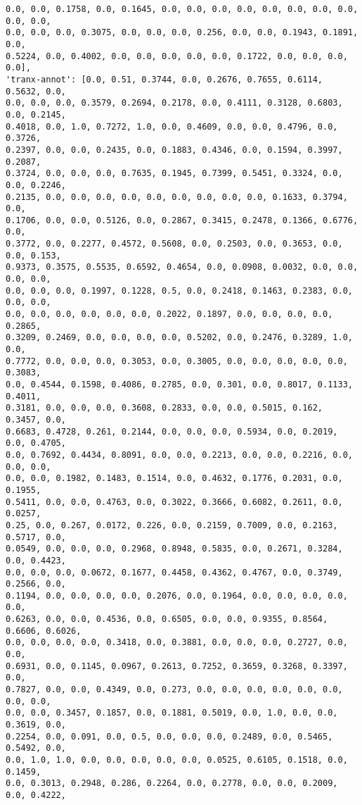 \documentclass[11pt]{article}
\begin{document}
\begin{Verbatim}[commandchars=\\\{\}]
0.0, 0.0, 0.1758, 0.0, 0.1645, 0.0, 0.0, 0.0, 0.0, 0.0, 0.0, 0.0, 0.0, 0.0, 0.0,
0.0, 0.0, 0.0, 0.3075, 0.0, 0.0, 0.0, 0.256, 0.0, 0.0, 0.1943, 0.1891, 0.0,
0.5224, 0.0, 0.4002, 0.0, 0.0, 0.0, 0.0, 0.0, 0.1722, 0.0, 0.0, 0.0, 0.0],
'tranx-annot': [0.0, 0.51, 0.3744, 0.0, 0.2676, 0.7655, 0.6114, 0.5632, 0.0,
0.0, 0.0, 0.0, 0.3579, 0.2694, 0.2178, 0.0, 0.4111, 0.3128, 0.6803, 0.0, 0.2145,
0.4018, 0.0, 1.0, 0.7272, 1.0, 0.0, 0.4609, 0.0, 0.0, 0.4796, 0.0, 0.3726,
0.2397, 0.0, 0.0, 0.2435, 0.0, 0.1883, 0.4346, 0.0, 0.1594, 0.3997, 0.2087,
0.3724, 0.0, 0.0, 0.0, 0.7635, 0.1945, 0.7399, 0.5451, 0.3324, 0.0, 0.0, 0.2246,
0.2135, 0.0, 0.0, 0.0, 0.0, 0.0, 0.0, 0.0, 0.0, 0.0, 0.1633, 0.3794, 0.0,
0.1706, 0.0, 0.0, 0.5126, 0.0, 0.2867, 0.3415, 0.2478, 0.1366, 0.6776, 0.0,
0.3772, 0.0, 0.2277, 0.4572, 0.5608, 0.0, 0.2503, 0.0, 0.3653, 0.0, 0.0, 0.153,
0.9373, 0.3575, 0.5535, 0.6592, 0.4654, 0.0, 0.0908, 0.0032, 0.0, 0.0, 0.0, 0.0,
0.0, 0.0, 0.0, 0.1997, 0.1228, 0.5, 0.0, 0.2418, 0.1463, 0.2383, 0.0, 0.0, 0.0,
0.0, 0.0, 0.0, 0.0, 0.0, 0.0, 0.2022, 0.1897, 0.0, 0.0, 0.0, 0.0, 0.2865,
0.3209, 0.2469, 0.0, 0.0, 0.0, 0.0, 0.5202, 0.0, 0.2476, 0.3289, 1.0, 0.0,
0.7772, 0.0, 0.0, 0.0, 0.3053, 0.0, 0.3005, 0.0, 0.0, 0.0, 0.0, 0.0, 0.3083,
0.0, 0.4544, 0.1598, 0.4086, 0.2785, 0.0, 0.301, 0.0, 0.8017, 0.1133, 0.4011,
0.3181, 0.0, 0.0, 0.0, 0.3608, 0.2833, 0.0, 0.0, 0.5015, 0.162, 0.3457, 0.0,
0.6683, 0.4728, 0.261, 0.2144, 0.0, 0.0, 0.0, 0.5934, 0.0, 0.2019, 0.0, 0.4705,
0.0, 0.7692, 0.4434, 0.8091, 0.0, 0.0, 0.2213, 0.0, 0.0, 0.2216, 0.0, 0.0, 0.0,
0.0, 0.0, 0.1982, 0.1483, 0.1514, 0.0, 0.4632, 0.1776, 0.2031, 0.0, 0.1955,
0.5411, 0.0, 0.0, 0.4763, 0.0, 0.3022, 0.3666, 0.6082, 0.2611, 0.0, 0.0257,
0.25, 0.0, 0.267, 0.0172, 0.226, 0.0, 0.2159, 0.7009, 0.0, 0.2163, 0.5717, 0.0,
0.0549, 0.0, 0.0, 0.0, 0.2968, 0.8948, 0.5835, 0.0, 0.2671, 0.3284, 0.0, 0.4423,
0.0, 0.0, 0.0, 0.0672, 0.1677, 0.4458, 0.4362, 0.4767, 0.0, 0.3749, 0.2566, 0.0,
0.1194, 0.0, 0.0, 0.0, 0.0, 0.2076, 0.0, 0.1964, 0.0, 0.0, 0.0, 0.0, 0.0,
0.6263, 0.0, 0.0, 0.4536, 0.0, 0.6505, 0.0, 0.0, 0.9355, 0.8564, 0.6606, 0.6026,
0.0, 0.0, 0.0, 0.0, 0.3418, 0.0, 0.3881, 0.0, 0.0, 0.0, 0.2727, 0.0, 0.0,
0.6931, 0.0, 0.1145, 0.0967, 0.2613, 0.7252, 0.3659, 0.3268, 0.3397, 0.0,
0.7827, 0.0, 0.0, 0.4349, 0.0, 0.273, 0.0, 0.0, 0.0, 0.0, 0.0, 0.0, 0.0, 0.0,
0.0, 0.0, 0.3457, 0.1857, 0.0, 0.1881, 0.5019, 0.0, 1.0, 0.0, 0.0, 0.3619, 0.0,
0.2254, 0.0, 0.091, 0.0, 0.5, 0.0, 0.0, 0.0, 0.2489, 0.0, 0.5465, 0.5492, 0.0,
0.0, 1.0, 1.0, 0.0, 0.0, 0.0, 0.0, 0.0, 0.0525, 0.6105, 0.1518, 0.0, 0.1459,
0.0, 0.3013, 0.2948, 0.286, 0.2264, 0.0, 0.2778, 0.0, 0.0, 0.2009, 0.0, 0.4222,

\end{Verbatim}
\end{document}

